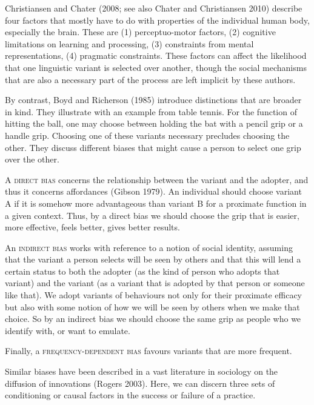 Christiansen and Chater (2008; see also Chater and Christiansen 2010) 
describe four factors that mostly have to do with properties of the 
individual human body, especially the brain. These are (1) perceptuo-motor 
factors, (2) cognitive limitations on learning and processing, (3) 
constraints from mental representations, (4) pragmatic constraints. 
These factors can affect the likelihood that one linguistic variant is 
selected over another, though the social mechanisms that are also a 
necessary part of the process are left implicit by these authors. 



By contrast, Boyd and Richerson (1985) introduce distinctions that are 
broader in kind. They illustrate with an example from table tennis. For 
the function of hitting the ball, one may choose between holding the bat 
with a pencil grip or a handle grip. Choosing one of these variants 
necessary precludes choosing the other. They discuss different biases 
that might cause a person to select one grip over the other. 



A \textsc{direct bias }concerns the relationship between the variant 
and the adopter, and thus it concerns affordances (Gibson 1979). An 
individual should choose variant A if it is somehow more advantageous 
than variant B for a proximate function in a given context. Thus, by a 
direct bias we should choose the grip that is easier, more effective, 
feels better, gives better results. 



An \textsc{indirect bias} works with reference to a notion of social 
identity, assuming that the variant a person selects will be seen by 
others and that this will lend a certain status to both the adopter (as 
the kind of person who adopts that variant) and the variant (as a 
variant that is adopted by that person or someone like that). We adopt 
variants of behaviours not only for their proximate efficacy but also 
with some notion of how we will be seen by others when we make that 
choice. So by an indirect bias we should choose the same grip as people 
who we identify with, or want to emulate. 



Finally, a \textsc{frequency-dependent bias} favours variants that are 
more frequent. 



Similar biases have been described in a vast literature in sociology on 
the diffusion of innovations (Rogers 2003). Here, we can discern three 
sets of conditioning or causal factors in the success or failure of a 
practice. 



